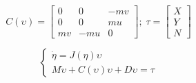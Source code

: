 \begin{equation*}
C(\upsilon) = \begin{bmatrix}
0 & 0 & -mv \\
0 & 0 & mu \\
mv & -mu & 0 
\end{bmatrix};\; \tau = \begin{bmatrix}
X \\
Y \\
N
\end{bmatrix}
\end{equation*}

\begin{equation*}
 \begin{cases}
   \Dot{\eta} = J(\eta)\upsilon\\
    M\Dot{\upsilon} + C(\upsilon)\upsilon + D\upsilon = \tau
 \end{cases}
\end{equation*}

